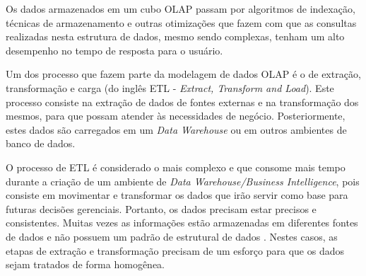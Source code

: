Os dados armazenados em um cubo OLAP passam por algoritmos de indexação, técnicas de armazenamento e outras otimizações que fazem com que as consultas realizadas nesta estrutura de dados, mesmo sendo complexas, tenham um alto desempenho no tempo de resposta para o usuário.

Um dos processo que fazem parte da modelagem de dados OLAP é o de extração, transformação e carga (do inglês ETL - \emph{Extract, Transform and Load}). Este processo consiste na extração de dados de fontes externas e na transformação dos mesmos, para que possam atender às necessidades de negócio. Posteriormente, estes dados são carregados em um \emph{Data Warehouse} ou em outros ambientes de banco de dados.

O processo de ETL é considerado o mais complexo e que consome mais tempo durante a criação de um ambiente de \emph{Data Warehouse/Business Intelligence}, pois consiste em movimentar e transformar os dados que irão servir como base para futuras decisões gerenciais. Portanto, os dados precisam estar precisos e consistentes. Muitas vezes as informações estão armazenadas em diferentes fontes de dados e não possuem um padrão de estrutural de dados \cite{kim13}. Nestes casos, as etapas de extração e transformação precisam de um esforço para que os dados sejam tratados de forma homogênea.























